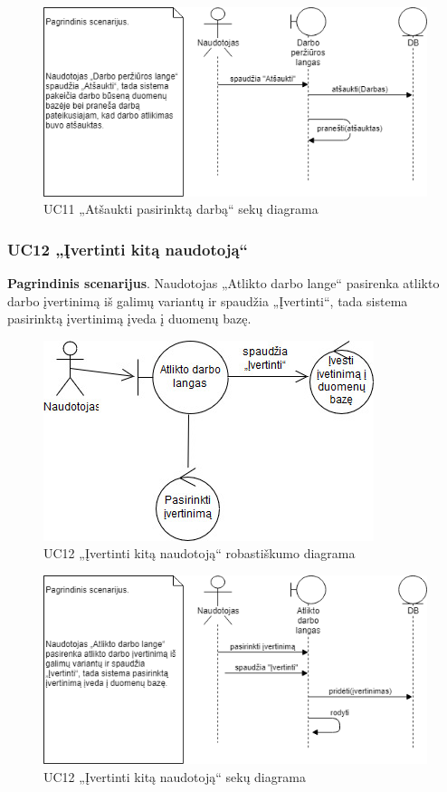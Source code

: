 \documentclass{VUMIFPSbakalaurinis}
\begin{document}
\begin{figure}[H]
	\centering
	\includegraphics[scale=0.6]{img/Sequence/SD11}
	\caption{UC11 „Atšaukti pasirinktą darbą“ sekų diagrama}
	\label{img:uc11seq}
\end{figure}

\subsubsection{UC12 „Įvertinti kitą naudotoją“}
\textbf{Pagrindinis scenarijus}. Naudotojas „Atlikto darbo lange“ pasirenka atlikto darbo įvertinimą iš galimų variantų ir spaudžia „Įvertinti“, tada sistema pasirinktą įvertinimą įveda į duomenų bazę.

\begin{figure}[H]
	\centering
	\includegraphics[scale=0.6]{img/Robustness/UC12}
	\caption{UC12 „Įvertinti kitą naudotoją“ robastiškumo diagrama}
	\label{img:uc12rob}
\end{figure}

\begin{figure}[H]
	\centering
	\includegraphics[scale=0.6]{img/Sequence/SD12}
	\caption{UC12 „Įvertinti kitą naudotoją“ sekų diagrama}
	\label{img:uc12seq}
\end{figure}
\end{document}
